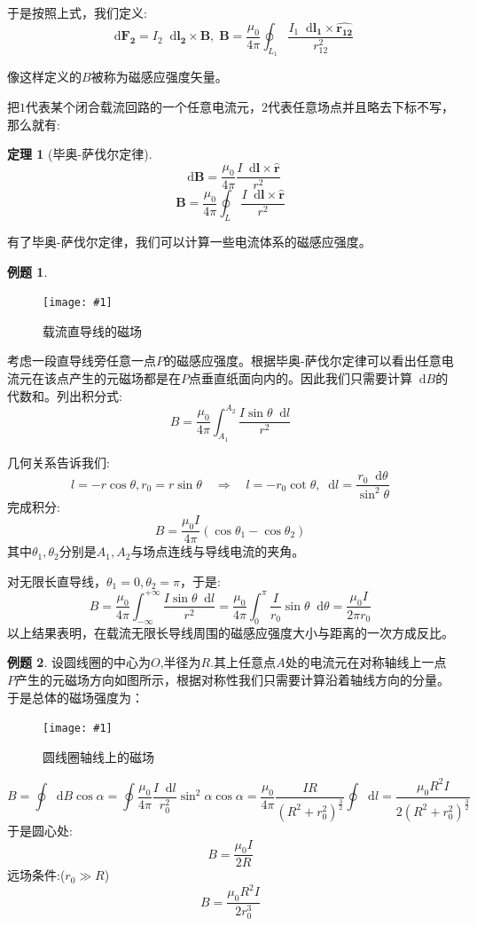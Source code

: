 \documentclass[12pt,a4paper,oneside]{report}
\newtheorem{theorem}{定理}[chapter]
\theoremstyle{definition}
\newtheorem{example}{例题}[chapter]
\theoremstyle{remark}
\newcommand{\insertfig}[3]{
    \begin{figure}[ht]
        \centering
        \texttt{[image: \#1]}
        \caption{#2}
        \label{fig:#1}
    \end{figure}
}
\renewcommand{\d}{\mathop{}\!\mathrm{d}}
\begin{document}
于是按照上式，我们定义:
\[
\d \mathbf{F_2} = I_2\d \mathbf{l_2}\times \mathbf{B}, \; \mathbf{B} = \frac{\mu_0}{4\pi}\oint_{L_1}\frac{I_1 \d \mathbf{l_1}\times {\mathbf{\hat{r_{12}}}}}{r^2_{12}}
\]

像这样定义的$B$被称为磁感应强度矢量。

把$1$代表某个闭合载流回路的一个任意电流元，$2$代表任意场点并且略去下标不写，那么就有:
\begin{theorem}[毕奥-萨伐尔定律]
\[
\d \mathbf{B}=  \frac{\mu_0}{4\pi}
\frac{I \d \mathbf{l}\times {\mathbf{\hat{r}}}}{r^2}
\]
\[
\mathbf{B} = \frac{\mu_0}{4\pi}
\oint_L \frac{I \d \mathbf{l}\times {\mathbf{\hat{r}}}}{r^2}
\]
\end{theorem}

有了毕奥-萨伐尔定律，我们可以计算一些电流体系的磁感应强度。

\begin{example}
  \insertfig{2-2.png}{载流直导线的磁场}{0.25}
考虑一段直导线旁任意一点$P$的磁感应强度。根据毕奥-萨伐尔定律可以看出任意电流元在该点产生的元磁场都是在$P$点垂直纸面向内的。因此我们只需要计算$\d B$的代数和。列出积分式:
\[
B = \frac{\mu_0}{4\pi}\int_{A_1}^{A_2}\frac{I\sin\theta\d l}{r^2}
\]

几何关系告诉我们:
\[
l=-r\cos\theta,r_0=r\sin\theta\quad\Rightarrow\quad l=-r_0\cot\theta,\d l = \frac{r_0 \d\theta}{\sin^2\theta}
\]
完成积分:
\[
B = \frac{\mu_0 I}{4\pi}(\cos\theta_1-\cos\theta_2)
\]
其中$\theta_1,\theta_2$分别是$A_1,A_2$与场点连线与导线电流的夹角。

对无限长直导线，$\theta_1=0,\theta_2=\pi$，于是:
\[
B = \frac{\mu_0}{4\pi}\int_{-\infty}^{+\infty}\frac{I\sin\theta\d l}{r^2}=\frac{\mu_0}{4\pi}\int_0^\pi\frac{I}{r_0}\sin \theta\d\theta=\frac{\mu_0 I}{2\pi r_0}
\]
以上结果表明，在载流无限长导线周围的磁感应强度大小与距离的一次方成反比。

\end{example}

\begin{example}
设圆线圈的中心为$O$,半径为$R$.其上任意点$A$处的电流元在对称轴线上一点$P$产生的元磁场方向如图所示，根据对称性我们只需要计算沿着轴线方向的分量。于是总体的磁场强度为：

\insertfig{2-3.png}{圆线圈轴线上的磁场}{0.25}
\[
B=\oint\d B \cos \alpha =\oint \frac{\mu_0}{4\pi} \frac{I\d l}{r_0^2}\sin^2\alpha\cos\alpha = \frac{\mu_0}{4\pi}\frac{IR}{(R^2+r_0^2)^{\frac{3}{2}}}\oint \d l =\frac{\mu_0R^2I}{2(R^2+r_0^2)^{\frac{3}{2}}}
\]
于是圆心处:
\[
B=\frac{\mu_0 I}{2R}
\]
远场条件:($r_0 \gg R$)
\[
B=\frac{\mu_0R^2I}{2r_0^3}
\]
\end{example}
\end{document}
